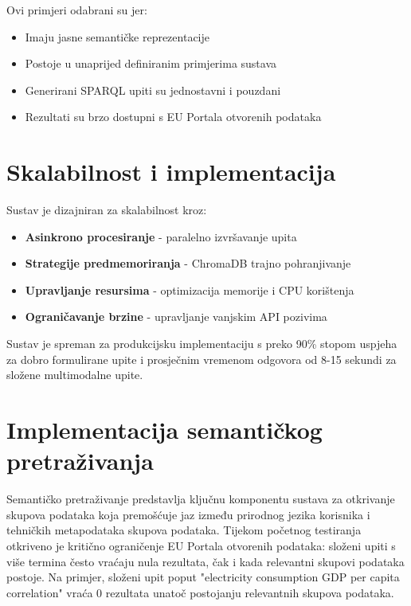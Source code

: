 Ovi primjeri odabrani su jer:
\begin{itemize}
    \item Imaju jasne semantičke reprezentacije
    \item Postoje u unaprijed definiranim primjerima sustava
    \item Generirani SPARQL upiti su jednostavni i pouzdani
    \item Rezultati su brzo dostupni s EU Portala otvorenih podataka
\end{itemize}

\section{Skalabilnost i implementacija}
\label{sec:scalability}

Sustav je dizajniran za skalabilnost kroz:
\begin{itemize}
    \item \textbf{Asinkrono procesiranje} - paralelno izvršavanje upita
    \item \textbf{Strategije predmemoriranja} - ChromaDB trajno pohranjivanje
    \item \textbf{Upravljanje resursima} - optimizacija memorije i CPU korištenja
    \item \textbf{Ograničavanje brzine} - upravljanje vanjskim API pozivima
\end{itemize}

Sustav je spreman za produkcijsku implementaciju s preko 90\% stopom uspjeha za dobro formulirane upite i prosječnim vremenom odgovora od 8-15 sekundi za složene multimodalne upite.

\section{Implementacija semantičkog pretraživanja}
\label{sec:semantic_search_implementation}

Semantičko pretraživanje predstavlja ključnu komponentu sustava za otkrivanje skupova podataka koja premošćuje jaz između prirodnog jezika korisnika i tehničkih metapodataka skupova podataka. Tijekom početnog testiranja otkriveno je kritično ograničenje EU Portala otvorenih podataka: složeni upiti s više termina često vraćaju nula rezultata, čak i kada relevantni skupovi podataka postoje. Na primjer, složeni upit poput "electricity consumption GDP per capita correlation" vraća 0 rezultata unatoč postojanju relevantnih skupova podataka.


